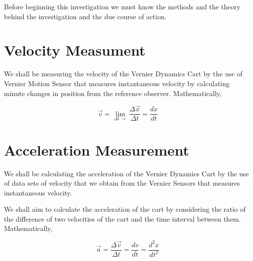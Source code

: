 {Before beginning this investigation we must know the methods and the theory behind the investigation and the due course of action.}

\section{{Velocity Measument}}

	{We shall be measuring the velocity of the Vernier Dynamics Cart by the use of Vernier Motion Sensor that measures instantaneous velocity by calculating minute changes in position from the reference observer. Mathematically,}

		$$\overrightarrow{v} = \lim_{\Delta t \rightarrow}\frac{\Delta \overrightarrow{x}}{\Delta t} = \frac{dx}{dt}$$

\section{{Acceleration Measurement}}

	{We shall be calculating the acceleration of the Vernier Dynamics Cart by the use of data sets of velocity that we obtain from the Vernier Sensors that measures instantaneous velocity.}
	
	{We shall aim to calculate the acceleration of the cart by considering the ratio of the difference of two velocities of the cart and the time interval between them. Mathematically,}	
	
		$$\overrightarrow{a} = \frac{\Delta \overrightarrow{v}}{\Delta t} = \frac{dv}{dt} = \frac{d^2x}{dt^2}$$	
		

